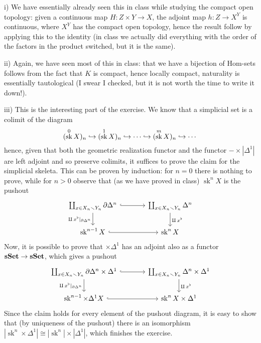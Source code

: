 \documentclass[a4paper,11pt,english]{article}
\DeclareMathOperator{\sk}{sk}
\begin{document}
\begin{exercise}[2]

i) We have essentially already seen this in class while studying the compact open topology: given a continuous map $H: Z \times Y \rightarrow X$, the adjoint map $h: Z \rightarrow X^{Y}$ is continuous, where $X^{Y}$ has the compact open topology, hence the result follow by applying this to the identity (in class we actually did everything with the order of the factors in the product switched, but it is the same).

ii) Again, we have seen most of this in class: that we have a bijection of Hom-sets follows from the fact that $K$ is compact, hence locally compact, naturality is essentially tautological (I swear I checked, but it is not worth the time to write it down!).

iii) This is the interesting part of the exercise. We know that a simplicial set is a colimit of the diagram
\[(\sk^0 X)_n\into (\sk^1 X)_n\into\cdots\into (\sk^m X)_n\into\cdots\]
hence, given that both the geometric realization functor and the functor $-\times|\Delta^{1}|$ are left adjoint and so preserve colimits, it suffices to prove the claim for the simplicial skeleta. This can be proven by induction: for $n=0$ there is nothing to prove, while for $n>0$ observe that (as we have proved in class) $\sk^n X$ is the pushout
\[
\begin{tikzcd}[column sep=large]
\coprod_{x\in X_n\sm Y_n}\de\Delta^n \ar[d,"\amalg\,x^\flat|_{\de\Delta^n}"'] \ar[r,hook] & \coprod_{x\in X_n\sm Y_n}\Delta^n \ar[d,"\amalg\,x^\flat"]\\
\sk^{n-1} X \ar[r,hook] & \sk^n X
\end{tikzcd}
\]
Now, it is possible to prove that $\times\Delta^1$ has an adjoint also as a functor $\operatorname{{\bf sSet}}\to\operatorname{{\bf sSet}}$, which gives a pushout
\[
\begin{tikzcd}[column sep=large]
\coprod_{x\in X_n\sm Y_n}\de\Delta^n\times\Delta^1 \ar[d,"\amalg\,x^\flat|_{\de\Delta^n}"'] \ar[r,hook] & \coprod_{x\in X_n\sm Y_n}\Delta^n\times\Delta^1 \ar[d,"\amalg\,x^\flat"]\\
\sk^{n-1}\times\Delta^1 X \ar[r,hook] & \sk^n X\times\Delta^1
\end{tikzcd}
\]
Since the claim holds for every element of the pushout diagram, it is easy to show that (by uniqueness of the pushout) there is an isomorphism $|\sk^n\times\Delta^1|\cong|\sk^n|\times|\Delta^1|$, which finishes the exercise.

\end{exercise}
\end{document}
